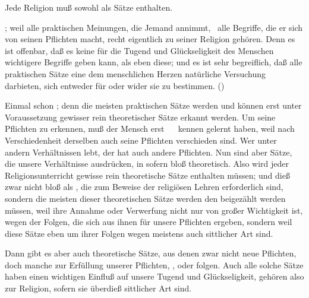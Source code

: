 \begin{aufza} 
\item Jede Religion muß sowohl  als  Sätze enthalten.
\begin{aufzb}
\item {}; weil alle praktischen Meinungen, die Jemand annimmt, \dh\ alle Begriffe, die er sich von seinen Pflichten macht, recht eigentlich zu seiner Religion gehören. Denn es ist offenbar, daß es keine für die Tugend und Glückseligkeit des Menschen wichtigere Begriffe geben kann, als eben diese; und es ist sehr begreiflich, daß alle praktischen Sätze eine dem menschlichen Herzen natürliche Versuchung darbieten, sich entweder für oder wider sie zu bestimmen. ()
\item {}
\begin{aufzc}
\item Einmal schon ; denn die meisten praktischen Sätze werden und können erst unter Voraussetzung gewisser rein theoretischer Sätze erkannt werden. Um seine Pflichten zu erkennen, muß der Mensch erst ~\  kennen gelernt haben, weil nach Verschiedenheit derselben auch seine Pflichten verschieden sind. Wer unter andern Verhältnissen lebt, der hat auch andere Pflichten. Nun sind aber Sätze, die unsere Verhältnisse ausdrücken, in sofern bloß theoretisch. Also wird jeder Religionsunterricht gewisse rein theoretische Sätze enthalten müssen; und dieß zwar nicht bloß als , die zum Beweise der religiösen Lehren erforderlich sind, sondern die meisten dieser theoretischen Sätze werden den  beigezählt werden müssen, weil ihre Annahme oder Verwerfung nicht nur von großer Wichtigkeit ist, wegen der Folgen, die sich aus ihnen für unsere Pflichten ergeben, sondern weil diese Sätze eben um ihrer Folgen wegen meistens auch sittlicher Art sind.
\item Dann gibt es aber auch theoretische Sätze, aus denen zwar nicht neue Pflichten, doch manche  zur Erfüllung unserer Pflichten, , oder  folgen. Auch alle solche Sätze haben einen wichtigen Einfluß auf unsere Tugend und Glückseligkeit, gehören also zur Religion, sofern sie überdieß sittlicher Art sind.

\end{aufzc}
\end{aufzb}
\end{aufza}
